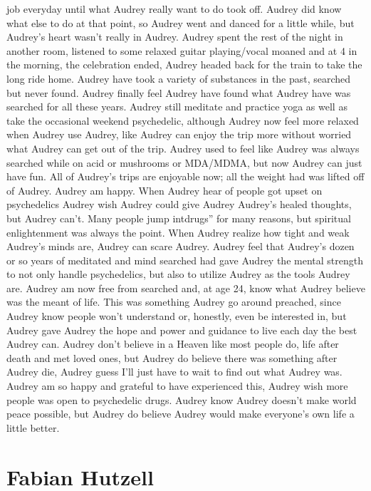 \documentclass[12pt]{book}
\begin{document}
job everyday until what Audrey really want to do took off. Audrey did know what else to do at that point, so Audrey went and danced for a little while, but Audrey's heart wasn't really in Audrey. Audrey spent the rest of the night in another room, listened to some relaxed guitar playing/vocal moaned and at 4 in the morning, the celebration ended, Audrey headed back for the train to take the long ride home. Audrey have took a variety of substances in the past, searched but never found. Audrey finally feel Audrey have found what Audrey have was searched for all these years. Audrey still meditate and practice yoga as well as take the occasional weekend psychedelic, although Audrey now feel more relaxed when Audrey use Audrey, like Audrey can enjoy the trip more without worried what Audrey can get out of the trip. Audrey used to feel like Audrey was always searched while on acid or mushrooms or MDA/MDMA, but now Audrey can just have fun. All of Audrey's trips are enjoyable now; all the weight had was lifted off of Audrey. Audrey am happy. When Audrey hear of people got upset on psychedelics Audrey wish Audrey could give Audrey Audrey's healed thoughts, but Audrey can't. Many people jump intdrugs'' for many reasons, but spiritual enlightenment was always the point. When Audrey realize how tight and weak Audrey's minds are, Audrey can scare Audrey. Audrey feel that Audrey's dozen or so years of meditated and mind searched had gave Audrey the mental strength to not only handle psychedelics, but also to utilize Audrey as the tools Audrey are. Audrey am now free from searched and, at age 24, know what Audrey believe was the meant of life. This was something Audrey go around preached, since Audrey know people won't understand or, honestly, even be interested in, but Audrey gave Audrey the hope and power and guidance to live each day the best Audrey can. Audrey don't believe in a Heaven like most people do, life after death and met loved ones, but Audrey do believe there was something after Audrey die, Audrey guess I'll just have to wait to find out what Audrey was. Audrey am so happy and grateful to have experienced this, Audrey wish more people was open to psychedelic drugs. Audrey know Audrey doesn't make world peace possible, but Audrey do believe Audrey would make everyone's own life a little better.



\chapter{Fabian Hutzell}
\end{document}
